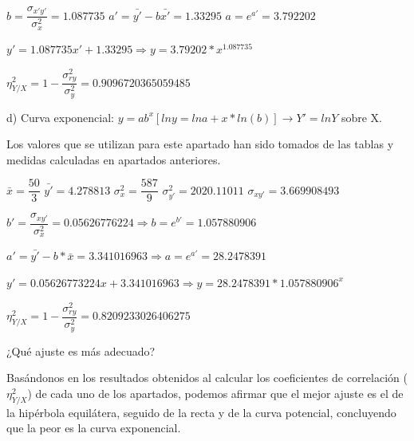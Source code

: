\documentclass[10pt,a4paper]{article}
\begin{document}
\begin{enumerate}
\vspace{0.25cm}
$b = \dfrac{\sigma_{x'y'}}{\sigma_{x}^2} = 1.087735$ \hspace{1.5cm} $a' = \bar{y'} - b \bar{x'} = 1.33295$ \hspace{1.5cm} $a = e^{a'} = 3.792202$

\begin{center}
$y' = 1.087735 x' +1.33295 \Rightarrow y = 3.79202*x^{1.087735}$
\end{center}

\vspace{0.25cm}
$\eta_{Y / X}^2 = 1 - \dfrac{\sigma_{ry}^2}{\sigma_y^2} = 0.9096720365059485$

\vspace{0.5cm}
\hspace{0.25cm} d) Curva exponencial: $y = ab^x [ln y = ln a + x*ln(b)] \rightarrow Y' = ln Y$ sobre X.

\vspace{0.25cm}
Los valores que se utilizan para este apartado han sido tomados de las tablas y medidas calculadas en apartados anteriores.

\vspace{0.25cm}
$\bar{x} = \dfrac{50}{3}$ \hspace{1cm} $\bar{y'} = 4.278813$ \hspace{1cm} $\sigma_{x}^2 = \dfrac{587}{9}$ \hspace{1cm} $\sigma_{y'}^2 = 2020.11011$ \hspace{1cm} $\sigma_{xy'} = 3.669908493$

\vspace{0.25cm}
$b' = \dfrac{\sigma_{xy'}}{\sigma_{x}^2} = 0.05626776224 \Rightarrow b = e^{b'} = 1.057880906$

\vspace{0.25cm}
$a' = \bar{y'} - b * \bar{x} = 3.341016963 \Rightarrow a = e^{a'} = 28.2478391$

\begin{center}
$y' = 0.05626773224x + 3.341016963 \Rightarrow y = 28.2478391*1.057880906^x$
\end{center} 

\vspace{0.25cm}
$\eta_{Y / X}^2 = 1 - \dfrac{\sigma_{ry}^2}{\sigma_y^2} = 0.8209233026406275$


\vspace{0.5cm}
\hspace{0.25cm} ¿Qué ajuste es más adecuado?

\vspace{0.25cm}
Basándonos en los resultados obtenidos al calcular los coeficientes de correlación ($\eta_{Y/X}^2$) de cada uno de los apartados, podemos afirmar que el mejor ajuste es el de la hipérbola equilátera, seguido de la recta y de la curva potencial, concluyendo que la peor es la curva exponencial.


\end{enumerate}
\end{document}
